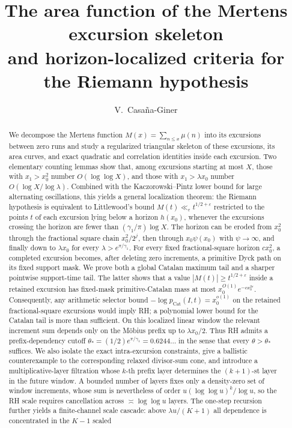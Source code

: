 \documentclass[11pt]{amsart}
\title[The Mertens excursion skeleton]{The area function of the Mertens excursion skeleton\\
and horizon-localized criteria for the Riemann hypothesis}
\author{V.~Casa\~na-Giner}
\date{}
\numberwithin{equation}{section}
\theoremstyle{plain}
\theoremstyle{definition}
\theoremstyle{remark}
\newcommand{\eps}{\varepsilon}
\begin{document}
\begin{abstract}
We decompose the Mertens function $M(x)=\sum_{n\le x}\mu(n)$ into its
excursions between zero runs and study a regularized triangular skeleton of
these excursions, its area curves, and exact quadratic and correlation
identities inside each excursion. Two elementary counting lemmas show that,
among excursions starting at most $X$, those with $x_1>x_0^2$ number
$O(\log\log X)$, and those with $x_1>\lambda x_0$ number
$O(\log X/\log\lambda)$. Combined with the Kaczorowski--Pintz lower bound for
large alternating oscillations, this yields a general localization theorem:
the Riemann hypothesis is equivalent to Littlewood's bound
$M(t)\ll_\eps t^{1/2+\eps}$ restricted to the points $t$ of each excursion
lying below a horizon $h(x_0)$, whenever the excursions crossing the horizon
are fewer than $(\gamma_1/\pi)\log X$. The horizon can be eroded from $x_0^2$ through the fractional square
chain $x_0^2/2^j$, then through $x_0\psi(x_0)$ with $\psi\to\infty$, and
finally down to $\lambda x_0$ for every
$\lambda>e^{\pi/\gamma_1}$. For every fixed fractional-square horizon $cx_0^2$, a completed excursion becomes, after deleting zero increments, a primitive Dyck path on its fixed support mask.  We prove both a global Catalan maximum tail and a sharper pointwise support-time tail.  The latter shows that a value $|M(t)|\ge t^{1/2+\eps}$ inside a retained excursion has fixed-mask primitive-Catalan mass at most $x_0^{O(1)}e^{-c x_0^{2\eps}}$.  Consequently, any arithmetic selector bound $-\log p_{\mathrm{Cat}}(I,t)=x_0^{o(1)}$ on the retained fractional-square excursions would imply RH; a polynomial lower bound for the Catalan tail is more than sufficient. On this localized linear window the relevant
increment sum depends only on the M\"obius prefix up to $\lambda x_0/2$.
Thus RH admits a prefix-dependency cutoff
$\theta_*=(1/2)e^{\pi/\gamma_1}=0.6244\ldots$ in the sense that every
$\theta>\theta_*$ suffices. We also isolate the exact intra-excursion
constraints, give a ballistic counterexample to the corresponding relaxed
divisor-sum cone, and introduce a multiplicative-layer filtration whose
$k$-th prefix layer determines the $(k+1)$-st layer in the future window.  A bounded number of layers fixes only a density-zero set of window
increments, whose sum is nevertheless of order $u(\log\log u)^k/\log u$, so
the RH scale requires cancellation across $\asymp\log\log u$ layers.  The one-step
recursion further yields a finite-channel scale cascade: above
$\lambda u/(K+1)$ all dependence is concentrated in the $K-1$ scaled

\end{abstract}
\end{document}
